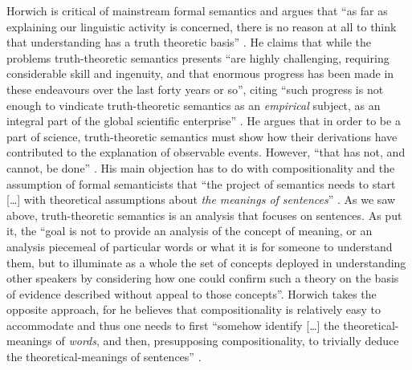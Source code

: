 Horwich is critical of mainstream formal semantics and argues that “as far as explaining our linguistic activity is concerned, there is no reason at all to think that understanding has a truth theoretic basis” \citep[318]{Horwich2008}. He claims that while the problems truth-theoretic semantics presents “are highly challenging, requiring considerable skill and ingenuity, and that enormous progress has been made in these endeavours over the last forty years or so”, citing “such progress is not enough to vindicate truth-theoretic semantics as an \textit{empirical} subject, as an integral part of the global scientific enterprise” \citep[318, fn. 12, emphasis in original]{Horwich2008}. He argues that in order to be a part of science, truth-theoretic semantics must show how their derivations have contributed to the explanation of observable events. However, “that has not, and cannot, be done” \citep[318]{Horwich2008}. His main objection has to do with compositionality and the assumption of formal semanticists that “the project of semantics needs to start […] with theoretical assumptions about \textit{the meanings of sentences}” \citep[314, emphasis in original]{Horwich2008}. As we saw above, truth-theoretic semantics is an analysis that focuses on sentences. As \citet[4]{LeporeLudwig2007} put it, the “goal is not to provide an analysis of the concept of meaning, or an analysis piecemeal of particular words or what it is for someone to understand them, but to illuminate as a whole the set of concepts deployed in understanding other speakers by considering how one could confirm such a theory on the basis of evidence described without appeal to those concepts”. Horwich takes the opposite approach, for he believes that compositionality is relatively easy to accommodate and thus one needs to first “somehow identify […] the theoretical-meanings of \textit{words}, and then, presupposing compositionality, to trivially deduce the theoretical-meanings of sentences” \citep[314, emphasis in original]{Horwich2008}.

